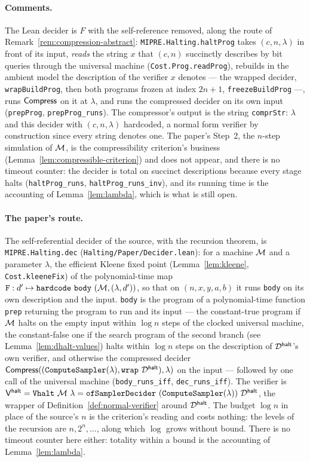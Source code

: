 \paragraph{Comments.} The Lean decider is $F$ with the self-reference removed, along the
route of Remark~\ref{rem:compression-abstract}: \texttt{MIPRE.Halting.haltProg} takes
$(c, n, \lambda)$ in front of its input, \emph{reads} the string $x$ that $(c, n)$ succinctly
describes by bit queries through the universal machine (\texttt{Cost.Prog.readProg}), rebuilds
in the ambient model the description of the verifier $x$ denotes --- the wrapped decider,
\texttt{wrapBuildProg}, then both programs frozen at index $2n + 1$,
\texttt{freezeBuildProg} ---, runs $\mathsf{Compress}$ on it at $\lambda$, and runs the compressed
decider on its own input (\texttt{prepProg}, \texttt{prepProg\_runs}). The compressor's output
is the string \texttt{comprStr}: $\lambda$ and this decider with $(c, n, \lambda)$ hardcoded,
a normal form verifier by construction since every string denotes one. The paper's Step~2,
the $n$-step simulation of $\mathcal{M}$, is the compressibility criterion's business
(Lemma~\ref{lem:compressible-criterion}) and does not appear, and there is no timeout
counter: the decider is total on succinct descriptions because every stage halts
(\texttt{haltProg\_runs}, \texttt{haltProg\_runs\_inv}), and its running time is the
accounting of Lemma~\ref{lem:lambda}, which is what is still open.

\paragraph{The paper's route.} The self-referential decider of the source, with the
recursion theorem, is \texttt{MIPRE.Halting.dec} (\texttt{Halting/Paper/Decider.lean}): for a
machine $\mathcal{M}$ and a parameter $\lambda$, the efficient Kleene fixed point
(Lemma~\ref{lem:kleene}, \texttt{Cost.kleeneFix}) of the polynomial-time map
$\texttt{F}: d' \mapsto \mathtt{hardcode}\ \texttt{body}\ (\machine, (\lambda, d'))$,
so that on $(n, x, y, a, b)$ it runs \texttt{body} on its own description and the input.
\texttt{body} is the program of a polynomial-time function \texttt{prep} returning the
program to run and its input --- the constant-true program if $\mathcal{M}$ halts on the
empty input within $\log n$ steps of the clocked universal machine, the constant-false one
if the search program of the second branch (see Lemma~\ref{lem:dhalt-values}) halts within
$\log n$ steps on the description of $\mathcal{D}^{\mathsf{halt}}$'s own verifier, and otherwise the compressed
decider $\mathsf{Compress}((\mathtt{ComputeSampler}(\lambda), \mathtt{wrap}\ \mathcal{D}^{\mathsf{halt}}), \lambda)$
on the input --- followed by one call of the universal machine
(\texttt{body\_runs\_iff}, \texttt{dec\_runs\_iff}). The verifier is
$\vhalt = \texttt{Vhalt}\ \machine\ \lambda =
\mathtt{ofSamplerDecider}\ (\mathtt{ComputeSampler}(\lambda))\ \dhalt$, the wrapper of
Definition~\ref{def:normal-verifier} around $\mathcal{D}^{\mathsf{halt}}$. The budget $\log n$ in place of the
source's $n$ is the criterion's reading and costs nothing: the levels of the recursion are
$n, 2^n, \ldots$, along which $\log$ grows without bound. There is no timeout counter here
either: totality within a bound is the accounting of Lemma~\ref{lem:lambda}.

